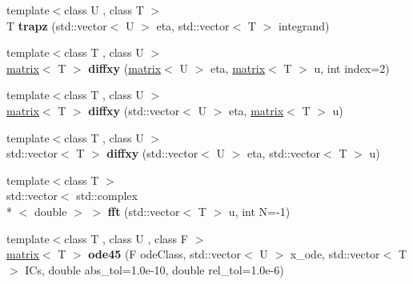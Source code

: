 \begin{DoxyCompactItemize}
\item 
\hypertarget{namespacekeycpp_ad817c482d12509f0938849890bb4de4e}{{\footnotesize template$<$class U , class T $>$ }\\T {\bfseries trapz} (std\-::vector$<$ U $>$ eta, std\-::vector$<$ T $>$ integrand)}\label{namespacekeycpp_ad817c482d12509f0938849890bb4de4e}

\item 
\hypertarget{namespacekeycpp_a379324b1d1cb219fdde96c9678aa5341}{{\footnotesize template$<$class T , class U $>$ }\\\hyperlink{classkeycpp_1_1matrix}{matrix}$<$ T $>$ {\bfseries diffxy} (\hyperlink{classkeycpp_1_1matrix}{matrix}$<$ U $>$ eta, \hyperlink{classkeycpp_1_1matrix}{matrix}$<$ T $>$ u, int index=2)}\label{namespacekeycpp_a379324b1d1cb219fdde96c9678aa5341}

\item 
\hypertarget{namespacekeycpp_a5b09f118fe12b83865ff08fe3d3633ff}{{\footnotesize template$<$class T , class U $>$ }\\\hyperlink{classkeycpp_1_1matrix}{matrix}$<$ T $>$ {\bfseries diffxy} (std\-::vector$<$ U $>$ eta, \hyperlink{classkeycpp_1_1matrix}{matrix}$<$ T $>$ u)}\label{namespacekeycpp_a5b09f118fe12b83865ff08fe3d3633ff}

\item 
\hypertarget{namespacekeycpp_a3bdbcb862d76b1b1fb5157788b7336ae}{{\footnotesize template$<$class T , class U $>$ }\\std\-::vector$<$ T $>$ {\bfseries diffxy} (std\-::vector$<$ U $>$ eta, std\-::vector$<$ T $>$ u)}\label{namespacekeycpp_a3bdbcb862d76b1b1fb5157788b7336ae}

\item 
\hypertarget{namespacekeycpp_a6b17b3d224192fffc838834ff736d572}{{\footnotesize template$<$class T $>$ }\\std\-::vector$<$ std\-::complex\\*
$<$ double $>$ $>$ {\bfseries fft} (std\-::vector$<$ T $>$ u, int N=-\/1)}\label{namespacekeycpp_a6b17b3d224192fffc838834ff736d572}

\item 
\hypertarget{namespacekeycpp_a880f7df231a78f912b3fb5d301c809f9}{{\footnotesize template$<$class T , class U , class F $>$ }\\\hyperlink{classkeycpp_1_1matrix}{matrix}$<$ T $>$ {\bfseries ode45} (F ode\-Class, std\-::vector$<$ U $>$ x\-\_\-ode, std\-::vector$<$ T $>$ I\-Cs, double abs\-\_\-tol=1.\-0e-\/10, double rel\-\_\-tol=1.\-0e-\/6)}\label{namespacekeycpp_a880f7df231a78f912b3fb5d301c809f9}


\end{DoxyCompactItemize}
